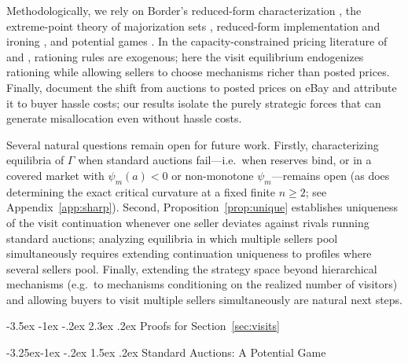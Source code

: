 \documentclass[12pt]{article}
\makeatletter
\newcommand{\citeasnoun}[1]{\citet{#1}}
\theoremstyle{mystyle}
\theoremstyle{mystyle2}
\newcommand{\mmpfont}{\scshape}
\renewcommand\section{\@startsection {section}{1}{\z@}%
                                   {-3.5ex \@plus -1ex \@minus -.2ex}%
                                   {2.3ex \@plus .2ex}%
                                   {\normalfont\large\mmpfont}}
\renewcommand\subsection{\@startsection{subsection}{2}{\z@}%
                                     {-3.25ex\@plus -1ex \@minus -.2ex}%
                                     {1.5ex \@plus .2ex}%
                                     {\normalfont\normalsize\mmpfont}}
\newcommand{\1}{\mathbf{1}}
\makeatother
\begin{document}
Methodologically, we rely on Border's reduced-form characterization \citep{border1,che2013,hartreny2015}, the extreme-point theory of majorization sets \citep{kleiner2021}, reduced-form implementation and ironing \citep{manelli2010,toikka2011}, and potential games \citep{monderer1996,vetta2002}. In the capacity-constrained pricing literature of \citeasnoun{kreps} and \citeasnoun{davidson}, rationing rules are exogenous; here the visit equilibrium endogenizes rationing while allowing sellers to choose mechanisms richer than posted prices. Finally, \citeasnoun{einav2018} document the shift from auctions to posted prices on eBay and attribute it to buyer hassle costs; our results isolate the purely strategic forces that can generate misallocation even without hassle costs.

Several natural questions remain open for future work. Firstly, characterizing equilibria of $\Gamma$ when standard auctions fail---i.e.\ when reserves bind, or in a covered market with $\psi_m(a)<0$ or non-monotone $\psi_m$---remains open (as does determining the exact critical curvature at a fixed finite $n\ge 2$; see Appendix~\ref{app:sharp}). Second, Proposition~\ref{prop:unique} establishes uniqueness of the visit continuation whenever one seller deviates against rivals running standard auctions; analyzing equilibria in which multiple sellers pool simultaneously requires extending continuation uniqueness to profiles where several sellers pool. Finally, extending the strategy space beyond hierarchical mechanisms (e.g.\ to mechanisms conditioning on the realized number of visitors) and allowing buyers to visit multiple sellers simultaneously are natural next steps.

\appendix
{}

\section{Proofs for Section~\ref{sec:visits}} \label{app:visits}

\subsection{Standard Auctions: A Potential Game}
\end{document}
